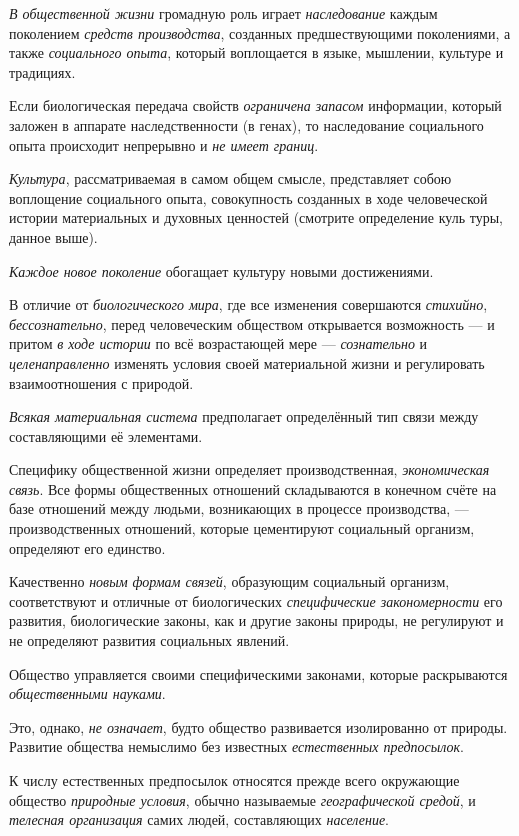 \documentclass[a4paper,14pt,russian]{extreport}
\begin{document}
\emph{В общественной жизни} громадную роль играет \emph{наследование} каждым поколением \emph{средств производства}, созданных предшествующими поколениями, а также \emph{социального опыта}, который воплощается в языке, мышлении, культуре и традициях.

Если биологическая передача свойств \emph{ограничена запасом} информации, который заложен в аппарате наследственности (в генах), то наследование социального опыта происходит непрерывно и \emph{не имеет границ}.

\emph{Культура}, рассматриваемая в самом общем смысле, представляет собою воплощение социального опыта, совокупность созданных в ходе человеческой истории материальных и духовных ценностей (смотрите определение куль туры, данное выше).

\emph{Каждое новое поколение} обогащает культуру новыми достижениями.

В отличие от \emph{биологического мира}, где все изменения совершаются \emph{стихийно}, \emph{бессознательно}, перед человеческим обществом открывается возможность --- и притом \emph{в ходе истории} по всё возрастающей мере --- \emph{сознательно} и \emph{целенаправленно} изменять условия своей материальной жизни и регулировать взаимоотношения с природой.

\emph{Всякая материальная система} предполагает определённый тип связи между составляющими её элементами.

Специфику общественной жизни определяет производственная, \emph{экономическая связь}. Все формы общественных отношений складываются в конечном счёте на базе отношений между людьми, возникающих в процессе производства, --- производственных отношений, которые цементируют социальный организм, определяют его единство.

Качественно \emph{новым формам связей}, образующим социальный организм, соответствуют и отличные от биологических \emph{специфические закономерности} его развития, биологические законы, как и другие законы природы, не регулируют и не определяют развития социальных явлений.

Общество управляется своими специфическими законами, которые раскрываются \emph{общественными науками}.

Это, однако, \emph{не означает}, будто общество развивается изолированно от природы. Развитие общества немыслимо без известных \emph{естественных предпосылок}.

К числу естественных предпосылок относятся прежде всего окружающие общество \emph{природные условия}, обычно называемые \emph{географической средой}, и \emph{телесная организация} самих людей, составляющих \emph{население}.
\end{document}
